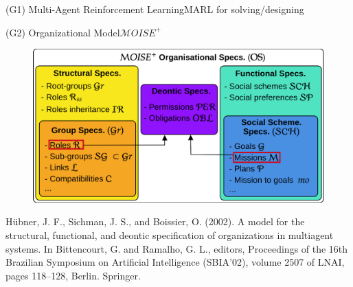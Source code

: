 \begin{frame}{(G1) Multi-Agent Reinforcement Learning}{MARL for solving/designing}
\end{frame}

\begin{frame}{(G2) Organizational Model}{$\mathcal{M}OISE^+$}

    \begin{figure}
        \centering
        \includegraphics[width=0.75\linewidth]{figures/moise_model.png}
    \end{figure}

    \begin{spacing}{0.25}
        {\tiny Hübner, J. F., Sichman, J. S., and Boissier, O. (2002).
            A model for the structural, functional, and deontic specification of
            organizations in multiagent systems.
            In Bittencourt, G. and Ramalho, G. L., editors, Proceedings of the 16th Brazilian Symposium on Artificial Intelligence (SBIA’02), volume 2507 of LNAI, pages 118–128, Berlin. Springer.}
    \end{spacing}

\end{frame}

